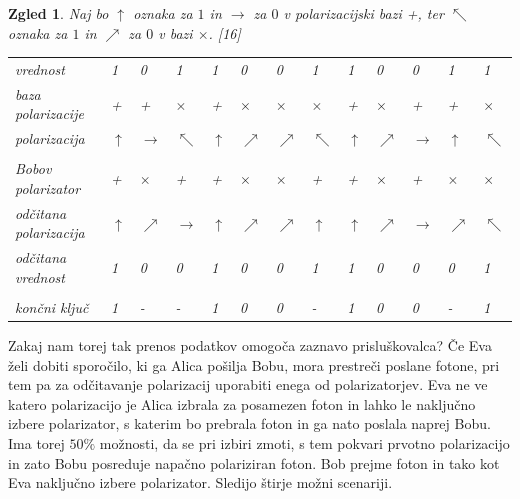 \documentclass[A4paper, 11pt]{article}
\newtheorem{zgled}{Zgled}
\begin{document}
\begin{zgled}
Naj bo $\uparrow$ oznaka za $1$ in $\rightarrow$ za $0$ v polarizacijski bazi +, ter $\nwarrow$ oznaka za $1$ in $\nearrow$ za $0$ v bazi $\times$. [16]


\begin{center}
\begin{tabular}{ l m{0.3 cm} m{0.3 cm} m{0.3 cm} m{0.3 cm} m{0.3 cm} m{0.3 cm} m{0.3 cm} m{0.3 cm} m{0.3 cm} m{0.3 cm} m{0.3 cm} m{0.3 cm}}
vrednost & 1 & 0 & 1 & 1 & 0 & 0 & 1 & 1 & 0 & 0 & 1 & 1 \\
baza polarizacije & + & + & $\times$ & + & $\times$ & $\times$ & $\times$ & + & $\times$ & + & + & $\times$\\
polarizacija & $\uparrow$ & $\rightarrow$ & $\nwarrow$ & $\uparrow$ & $\nearrow$ & $\nearrow$ & $\nwarrow$  & $\uparrow$ & $\nearrow$ & $\rightarrow$ & $\uparrow$ & $\nwarrow$\\
\\
Bobov polarizator & + & $\times$ & + & + & $\times$ & $\times$ & + & + & $\times$ & + & $\times$ & $\times$\\
odčitana polarizacija & $\uparrow$ & $\nearrow$ & $\rightarrow$ & $\uparrow$ & $\nearrow$  & $\nearrow$ & $\uparrow$ & $\uparrow$ & $\nearrow$ & $\rightarrow$ & $\nearrow$ & $\nwarrow$\\
odčitana vrednost & 1 & 0 & 0 & 1 & 0 & 0 & 1 & 1 & 0 & 0 & 0 & 1\\
\\
končni ključ & 1 & - & - & 1 & 0 & 0 & - & 1 & 0 & 0 & - & 1\\
\end{tabular}
\end{center}

\end{zgled}

Zakaj nam torej tak prenos podatkov omogoča zaznavo prisluškovalca?
Če Eva želi dobiti sporočilo, ki ga Alica pošilja Bobu, mora prestreči poslane fotone, pri tem pa za odčitavanje polarizacij uporabiti enega od polarizatorjev. Eva ne ve katero polarizacijo je Alica izbrala za posamezen foton in lahko le naključno izbere polarizator, s katerim bo prebrala foton in ga nato poslala naprej Bobu. Ima torej $50\%$ možnosti, da se pri izbiri zmoti, s tem pokvari prvotno polarizacijo in zato Bobu posreduje napačno polariziran foton. Bob prejme foton in tako kot Eva naključno izbere polarizator. Sledijo štirje možni scenariji.
\end{document}
